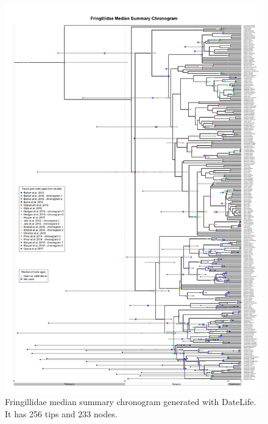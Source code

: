 \begin{figure}[!h]
\includegraphics{../figures/figure-fringillidae/median_and_calibration_ages-congruified.png}
\caption{Fringillidae median summary chronogram generated with DateLife. It has 256 tips and 233 nodes.}
\label{fig:fringillidages}
\end{figure}
